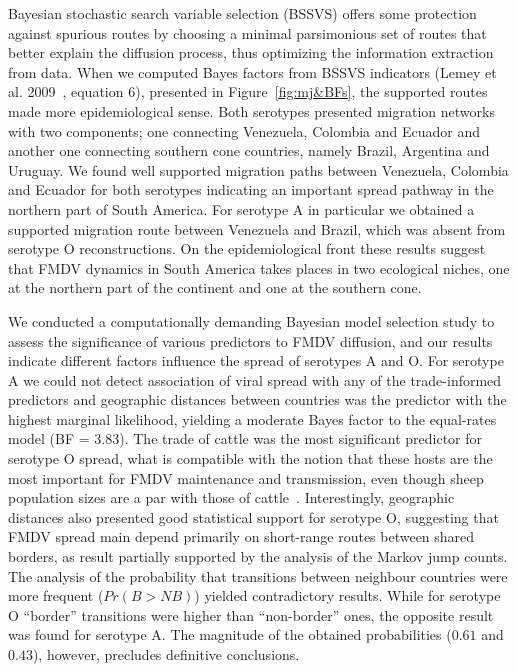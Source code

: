\documentclass[10pt]{article}
\begin{document}
Bayesian stochastic search variable selection (BSSVS) offers some protection against spurious routes by choosing a minimal parsimonious set of routes that better explain the diffusion process, thus optimizing the information extraction from data. 
When we computed Bayes factors from BSSVS indicators (Lemey et al. 2009~\cite{roots}, equation 6), presented in Figure~\ref{fig:mj&BFs}, the supported routes made more epidemiological sense.
Both serotypes presented migration networks with two components; one connecting Venezuela, Colombia and Ecuador and another one connecting southern cone countries, namely Brazil, Argentina and Uruguay.
We found well supported migration paths between Venezuela, Colombia and Ecuador for both serotypes  indicating an important spread pathway in the northern part of South America.
For serotype A in particular we obtained a supported migration route between Venezuela and Brazil, which was absent from serotype O reconstructions.
On the epidemiological front these results suggest that FMDV dynamics in South America takes places in two ecological niches, one at the northern part of the continent and one at the southern cone. 


We conducted a computationally demanding Bayesian model selection study to assess the significance of various predictors to FMDV diffusion, and our results indicate different factors influence the spread of serotypes A and O.
For serotype A we could not detect association of viral spread with any of the trade-informed predictors and geographic distances between countries was the predictor with the highest marginal likelihood, yielding a moderate Bayes factor to the equal-rates model (BF = $3.83$).
The trade of cattle was the most significant predictor for serotype O spread, what is compatible with the notion that these hosts are the most important for FMDV maintenance and transmission, even though sheep population sizes are a par with those of cattle~\cite{Saraiva2003}.
Interestingly, geographic distances also presented good statistical support for serotype O, suggesting that FMDV spread main depend primarily on short-range routes between shared borders, as result partially supported by the analysis of the Markov jump counts.
The analysis of the probability that transitions between neighbour countries were more frequent ($Pr(B>NB)$) yielded contradictory results.
While for serotype O ``border'' transitions were higher than ``non-border'' ones, the opposite result was found for serotype A.
The magnitude of the obtained probabilities ($0.61$ and $0.43$), however, precludes definitive conclusions. 
\end{document}
